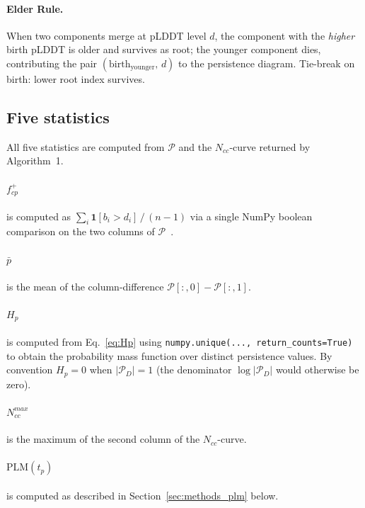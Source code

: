 \paragraph{Elder Rule.}
When two components merge at pLDDT level $d$, the component with the
\emph{higher} birth pLDDT is older and survives as root; the younger
component dies, contributing the pair $(\mathrm{birth}_{\mathrm{younger}},\,d)$
to the persistence diagram.
Tie-break on birth: lower root index survives.

\subsection{Five statistics}
\label{sec:methods_stats}

All five statistics are computed from $\mathcal{P}$ and the $N_{cc}$-curve
returned by Algorithm~1.

\paragraph{$f^+_{cp}$}
is computed as $\sum_i\mathbf{1}[b_i > d_i]\,/\,(n{-}1)$ via a single
NumPy boolean comparison on the two columns of $\mathcal{P}$~\cite{harris2020numpy}.

\paragraph{$\bar{p}$}
is the mean of the column-difference $\mathcal{P}[:,0] - \mathcal{P}[:,1]$.

\paragraph{$H_p$}
is computed from Eq.~\eqref{eq:Hp} using \texttt{numpy.unique(...,
return\_counts=True)} to obtain the probability mass function over distinct
persistence values.
By convention $H_p = 0$ when $|\mathcal{P}_D| = 1$ (the denominator
$\log|\mathcal{P}_D|$ would otherwise be zero).

\paragraph{$N_{cc}^{max}$}
is the maximum of the second column of the $N_{cc}$-curve.

\paragraph{$\mathrm{PLM}(t_p)$}
is computed as described in Section~\ref{sec:methods_plm} below.

